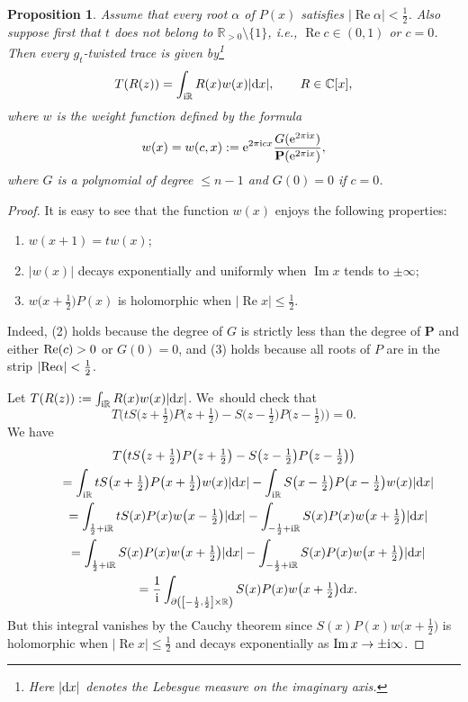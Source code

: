 \documentclass[10pt,a4paper]{amsart}
\newcommand{\RN}{\mathbb{R}} %
\renewcommand{\Im}{\mathop{\mathrm{Im}}\nolimits}
\renewcommand{\Re}{\operatorname{Re}}
\newcommand{\bP}{\mathbf{P}}
\newtheorem{Proposition}[Theorem]{Proposition}
\theoremstyle{definition}
\numberwithin{equation}{section}
\begin{document}
\begin{Proposition}\label{classtr}
\label{PropTracesForOpenStrip}
Assume that every root $\alpha$ of $P(x)$ satisfies $|\Re\alpha|<\frac{1}{2}$. Also suppose first that $t$ does not belong to $\RN_{>0}\setminus\{1\}$, i.e., $\Re c\in (0,1)$ or $c=0$. Then every $g_t$-twisted trace is given by\footnote{Here $|{\rm d}x|$ denotes the Lebesgue measure on the imaginary axis.}
\[
T(R(z))=\int_{{\rm i}\RN} R(x)w(x)|{\rm d}x|, \qquad R\in \mathbb C[x],
\]
 where $w$ is the {\it weight function} defined by the formula
 \[
 w(x)=w(c,x):={\rm e}^{2\pi {\rm i}cx}\frac{G({\rm e}^{2\pi {\rm i} x})}{\bP({\rm e}^{2\pi {\rm i} x})},
 \]
 where $G$ is a polynomial of degree $\le n-1$ and $G(0)=0$ if $c=0$.
\end{Proposition}
\begin{proof}
It is easy to see that the function $w(x)$ enjoys the following properties:
\begin{enumerate}\itemsep=0pt
\item[$(1)$]
$w(x+1)=tw(x)$;
\item[$(2)$]
$|w(x)|$ decays exponentially and uniformly when $\Im x$ tends to $\pm\infty$;
\item[$(3)$]
$w\big(x+\frac{1}{2}\big)P(x)$ is holomorphic when $|\Re x|\leq \frac{1}{2}$.
\end{enumerate}

Indeed, (2) holds because the degree of $G$ is strictly less than the degree of $\mathbf{P}$ and either ${\rm Re}(c)>0$ or $G(0)=0$, and (3) holds because all roots of $P$ are in the strip $|{\rm Re}\alpha|<\frac{1}{2}$.

Let $T(R(z)):=\int_{{\rm i}\RN} R(x)w(x)|{\rm d}x|$. We~should check that
\[
T\big(tS\big(z+\tfrac{1}{2}\big)P\big(z+\tfrac{1}{2}\big)-S\big(z-\tfrac{1}{2}\big)P\big(z-\tfrac{1}{2}\big)\big)=0.
\]
We have \begin{gather*}
T\big(tS\big(z+\tfrac{1}{2}\big)P\big(z+\tfrac{1}{2}\big)-S\big(z-\tfrac{1}{2}\big)
P\big(z-\tfrac{1}{2}\big)\big)
\\ \qquad
{}=\int_{{\rm i}\RN}tS\big(x+\tfrac{1}{2}\big)P\big(x+\tfrac{1}{2}\big)w(x)|{\rm d}x|-\int_{{\rm i}\RN}S\big(x-\tfrac{1}{2}\big)P\big(x-\tfrac{1}{2}\big)w(x)|{\rm d}x|
\\ \qquad
{}=\int_{\frac{1}{2}+{\rm i}\RN}tS(x)P(x)w\big(x-\tfrac{1}{2}\big)|{\rm d}x|-\int_{-\frac{1}{2}+{\rm i}\RN}S(x)P(x)w\big(x+\tfrac{1}{2}\big)|{\rm d}x|
\\ \qquad
{}=\int_{\frac{1}{2}+{\rm i}\RN}S(x)P(x)w\big(x+\tfrac{1}{2}\big)|{\rm d}x|-\int_{-\frac{1}{2}+{\rm i}\RN}S(x)P(x)w\big(x+\tfrac{1}{2}\big)|{\rm d}x|
\\ \qquad
{}=\frac{1}{{\rm i}}\int_{\partial \left(\left[-\frac{1}{2},\frac{1}{2}\right]\times \RN\right)}S(x)P(x)w\big(x+\tfrac{1}{2}\big){\rm d}x.
\end{gather*}
But this integral vanishes by the Cauchy theorem since $S(x)P(x)w\big(x+\tfrac{1}{2}\big)$ is holomorphic when $|\Re x|\leq \frac{1}{2}$ and decays exponentially as $\Im x\to\pm {\rm i}\infty$.


\end{proof}
\end{document}
